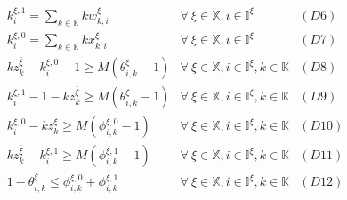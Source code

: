 \documentclass[]{interact}
\theoremstyle{plain}%
\theoremstyle{definition}
\theoremstyle{remark}
\begin{document}
\begin{eqnarray}
	k^{\xi,1}_i = \sum_{k\in \mathbb{K}}kw^{\xi}_{k,i}& \forall\ \xi\in \mathbb{X},i\in \mathbb{I}^{\xi}&(D6)\nonumber\\
	k^{\xi,0}_i = \sum_{k\in \mathbb{K}}kx^{\xi}_{k,i}& \forall\ \xi\in \mathbb{X},i\in \mathbb{I}^{\xi}&(D7)\nonumber\\
	kz^{\bar{\xi}}_k -k^{\xi,0}_i - 1 \ge M(\theta^{\xi}_{i,k}-1)& \forall\ \xi\in \mathbb{X},i\in \mathbb{I}^{\xi},k\in \mathbb{K}&(D8)\nonumber\\
	k^{\xi,1}_i - 1 - kz^{\bar{\xi}}_k \ge M(\theta^{\xi}_{i,k}-1)& \forall\ \xi\in \mathbb{X},i\in \mathbb{I}^{\xi},k\in \mathbb{K}&(D9)\nonumber\\
	k^{\xi,0}_i - kz^{\bar{\xi}}_k \ge M(\phi^{\xi,0}_{i,k}-1)&\forall\ \xi\in \mathbb{X},i\in \mathbb{I}^{\xi},k\in \mathbb{K}&(D10)\nonumber\\
	kz^{\bar{\xi}}_k - k^{\xi,1}_i \ge M(\phi^{\xi,1}_{i,k}-1)&\forall\ \xi\in \mathbb{X},i\in \mathbb{I}^{\xi},k\in \mathbb{K}&(D11)\nonumber\\
	1-\theta^{\xi}_{i,k} \le \phi^{\xi,0}_{i,k} + \phi^{\xi,1}_{i,k}&\forall\ \xi\in \mathbb{X},i\in \mathbb{I}^{\xi},k\in \mathbb{K}&(D12)\nonumber
\end{eqnarray}
\end{document}
